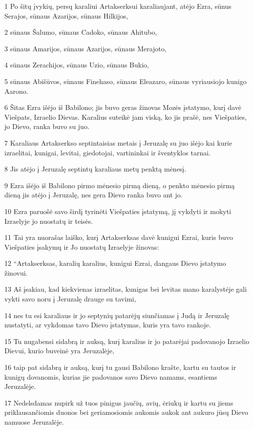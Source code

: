 \par 1 Po šitų įvykių, persų karaliui Artakserksui karaliaujant, atėjo Ezra, sūnus Serajos, sūnaus Azarijos, sūnaus Hilkijos, 
\par 2 sūnaus Šalumo, sūnaus Cadoko, sūnaus Ahitubo, 
\par 3 sūnaus Amarijos, sūnaus Azarijos, sūnaus Merajoto, 
\par 4 sūnaus Zerachijos, sūnaus Uzio, sūnaus Bukio, 
\par 5 sūnaus Abišūvos, sūnaus Finehaso, sūnaus Eleazaro, sūnaus vyriausiojo kunigo Aarono. 
\par 6 Šitas Ezra išėjo iš Babilono; jis buvo geras žinovas Mozės įstatymo, kurį davė Viešpats, Izraelio Dievas. Karalius suteikė jam viską, ko jis prašė, nes Viešpaties, jo Dievo, ranka buvo su juo. 
\par 7 Karaliaus Artakserkso septintaisias metais į Jeruzalę su juo išėjo kai kurie izraelitai, kunigai, levitai, giedotojai, vartininkai ir šventyklos tarnai. 
\par 8 Jis atėjo į Jeruzalę septintų karaliaus metų penktą mėnesį. 
\par 9 Ezra išėjo iš Babilono pirmo mėnesio pirmą dieną, o penkto mėnesio pirmą dieną jis atėjo į Jeruzalę, nes gera Dievo ranka buvo ant jo. 
\par 10 Ezra paruošė savo širdį tyrinėti Viešpaties įstatymą, jį vykdyti ir mokyti Izraelyje jo nuostatų ir teisės. 
\par 11 Tai yra nuorašas laiško, kurį Artakserksas davė kunigui Ezrai, kuris buvo Viešpaties įsakymų ir Jo nuostatų Izraelyje žinovas: 
\par 12 “Artakserksas, karalių karalius, kunigui Ezrai, dangaus Dievo įstatymo žinovui. 
\par 13 Aš įsakiau, kad kiekvienas izraelitas, kunigas bei levitas mano karalystėje gali vykti savo noru į Jeruzalę drauge su tavimi, 
\par 14 nes tu esi karaliaus ir jo septynių patarėjų siunčiamas į Judą ir Jeruzalę nustatyti, ar vykdomas tavo Dievo įstatymas, kuris yra tavo rankoje. 
\par 15 Tu nugabensi sidabrą ir auksą, kurį karalius ir jo patarėjai padovanojo Izraelio Dievui, kurio buveinė yra Jeruzalėje, 
\par 16 taip pat sidabrą ir auksą, kurį tu gausi Babilono krašte, kartu su tautos ir kunigų dovanomis, kurias jie padovanos savo Dievo namams, esantiems Jeruzalėje. 
\par 17 Nedelsdamas nupirk už tuos pinigus jaučių, avių, ėriukų ir kartu su jiems priklausančiomis duonos bei geriamosiomis aukomis aukok ant aukuro jūsų Dievo namuose Jeruzalėje. 

